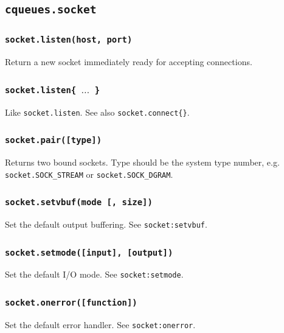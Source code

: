 \documentclass[11pt, oneside]{memoir}
\newcommand*{\fn}[1]{\texttt{#1}\xspace}
\newcounter{toccols}
\newenvironment{Module}[1]{
	\subsection{\texttt{#1}}
	\addtocontents{toc}{
		\protect\begin{multicols}{\value{toccols}}
	}
}{
	\addtocontents{toc}{\protect\end{multicols}}
}
\begin{document}
\begin{Module}{cqueues.socket}
\subsubsection[\fn{socket.listen}]{\fn{socket.listen(host, port)}}
	Return a new socket immediately ready for accepting connections.

\subsubsection[\fn{socket.listen}]{\fn{socket.listen\{ $\ldots$ \}}}
	Like \fn{socket.listen}. See also \fn{socket.connect\{\}}.

\subsubsection[\fn{socket.pair}]{\fn{socket.pair([type])}}
Returns two bound sockets. Type should be the system type number, e.g. \fn{socket.SOCK\_STREAM} or \fn{socket.SOCK\_DGRAM}.

\subsubsection[\fn{socket.setvbuf}]{\fn{socket.setvbuf(mode [, size])}}
	Set the default output buffering. See \fn{socket:setvbuf}.

\subsubsection[\fn{socket.setmode}]{\fn{socket.setmode([input], [output])}}
	Set the default I/O mode. See \fn{socket:setmode}.

\subsubsection[\fn{socket.onerror}]{\fn{socket.onerror([function])}}
	Set the default error handler. See \fn{socket:onerror}.




\end{Module}
\end{document}
